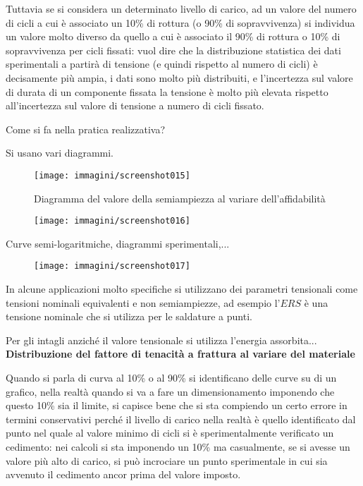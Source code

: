 \documentclass{article}
\begin{document}
\begin{adjustwidth}{2in}{}
			Tuttavia se si considera un determinato livello di carico, ad un valore del numero di cicli a cui è associato un 10\% di rottura (o 90\% di sopravvivenza) si individua un valore molto diverso da quello a cui è associato il 90\% di rottura o 10\% di sopravvivenza per cicli fissati: vuol dire che la distribuzione statistica dei dati sperimentali a partirà di tensione (e quindi rispetto al numero di cicli) è decisamente più ampia, i dati sono molto più distribuiti, e l'incertezza sul valore di durata di un componente fissata la tensione è molto più elevata rispetto all'incertezza sul valore di tensione a numero di cicli fissato. \newpage 
			
			Come si fa nella pratica realizzativa? 
			
			Si usano vari diagrammi.
			\begin{figure}[H]
				\centering
				\texttt{[image: immagini/screenshot015]}
				\caption{Diagramma del valore della semiampiezza al variare dell'affidabilità}
				\label{fig:screenshot015}
			\end{figure}
			\begin{figure}[H]
				\centering
				\texttt{[image: immagini/screenshot016]}
				\label{fig:screenshot016}
			\end{figure}			
			Curve semi-logaritmiche, diagrammi sperimentali,...
			\begin{figure}[H]
				\centering
				\texttt{[image: immagini/screenshot017]}

				\label{fig:screenshot017}
			\end{figure}
			In alcune applicazioni molto specifiche si utilizzano dei parametri tensionali come tensioni nominali equivalenti e non semiampiezze, ad esempio l'$ERS$ è una tensione nominale che si utilizza per le saldature a punti.
			 
			Per gli intagli anziché il valore tensionale si utilizza l'energia assorbita...
\newpage
			\textbf{{\Large Distribuzione del fattore di tenacità a frattura al variare del materiale}}
			
			 
			Quando si parla di curva al 10\% o al 90\% si identificano delle curve su di un grafico, nella realtà quando si va a fare un dimensionamento imponendo che questo 10\% sia il limite, si capisce bene che si sta compiendo un certo errore in termini conservativi perché il livello di carico nella realtà è quello identificato dal punto nel quale al valore minimo di cicli si è sperimentalmente verificato un cedimento: nei calcoli si sta imponendo un 10\% ma casualmente, se si avesse un valore più alto di carico, si può incrociare un punto sperimentale in cui sia avvenuto il cedimento ancor prima del valore imposto. 
			

\end{adjustwidth}
\end{document}
